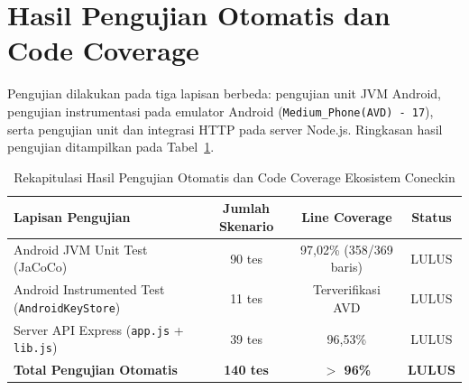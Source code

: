 \section{Hasil Pengujian Otomatis dan Code Coverage}
Pengujian dilakukan pada tiga lapisan berbeda: pengujian unit JVM Android, pengujian instrumentasi pada emulator Android (\texttt{Medium\_Phone(AVD) - 17}), serta pengujian unit dan integrasi HTTP pada server Node.js. Ringkasan hasil pengujian ditampilkan pada Tabel~\ref{tab:hasil-uji}.

\begin{table}[H]
\centering
\caption{Rekapitulasi Hasil Pengujian Otomatis dan Code Coverage Ekosistem Coneckin}
\label{tab:hasil-uji}
\begin{tabular}{@{}p{4.6cm}ccc@{}}
\toprule
\textbf{Lapisan Pengujian} & \textbf{Jumlah Skenario} & \textbf{Line Coverage} & \textbf{Status} \\
\midrule
Android JVM Unit Test (JaCoCo) & 90 tes & 97,02\% (358/369 baris) & LULUS \\
Android Instrumented Test (\texttt{AndroidKeyStore}) & 11 tes & Terverifikasi AVD & LULUS \\
Server API Express (\texttt{app.js} + \texttt{lib.js}) & 39 tes & 96,53\% & LULUS \\
\midrule
\textbf{Total Pengujian Otomatis} & \textbf{140 tes} & \textbf{$>$ 96\%} & \textbf{LULUS} \\
\bottomrule
\end{tabular}
\end{table}

